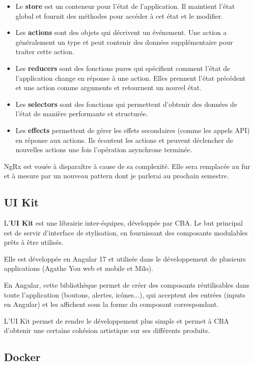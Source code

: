 \documentclass{article}
\begin{document}
\begin{itemize}
    \item Le \textbf{store} est un conteneur pour l'état de l'application. Il maintient l'état global et fournit des méthodes pour accéder à cet état et le modifier.
    \item Les \textbf{actions} sont des objets qui décrivent un événement. Une action a généralement un type et peut contenir des données supplémentaire pour traiter cette action.
    \item Les \textbf{reducers} sont des fonctions pures qui spécifient comment l'état de l'application change en réponse à une action. Elles prennent l'état précédent et une action comme arguments et retournent un nouvel état.
    \item Les \textbf{selectors} sont des fonctions qui permettent d'obtenir des données de l'état de manière performante et structurée.
    \item Les \textbf{effects} permettent de gérer les effets secondaires (comme les appels API) en réponse aux actions. Ils écoutent les actions et peuvent déclencher de nouvelles actions une fois l'opération asynchrone terminée.
\end{itemize}

NgRx est vouée à disparaître à cause de sa complexité. Elle sera remplacée au fur et à mesure par un nouveau pattern dont je parlerai au prochain semestre.

\subsection{UI Kit}
L'\textbf{UI Kit} est une librairie inter-équipes, développée par CBA.
Le but principal est de servir d'interface de stylisation, en fournissant des composants modulables prêts à être utilisés.

Elle est développée en Angular 17 et utilisée dans le développement de plusieurs applications (Agathe You web et mobile et Milo).

En Angular, cette bibliothèque permet de créer des composants réutilisables dans toute l'application (boutons, alertes, icônes...), qui acceptent des entrées (inputs en Angular) et les affichent sous la forme du composant correspondant.

L'UI Kit permet de rendre le développement plus simple et permet à CBA d'obtenir une certaine cohésion artistique sur ses différents produits.

\subsection{Docker}
\end{document}
